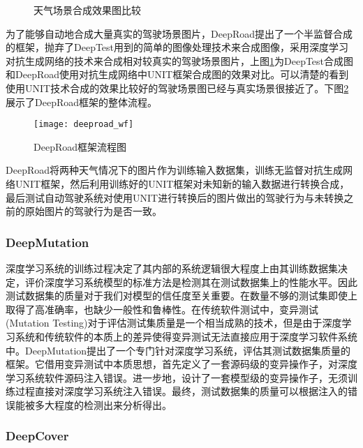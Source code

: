\begin{figure}[h]
    \centering
    \label{deeptest_effect}
    \caption{天气场景合成效果图比较}
\end{figure}

为了能够自动地合成大量真实的驾驶场景图片，DeepRoad提出了一个半监督合成的框架，抛弃了DeepTest用到的简单的图像处理技术来合成图像，采用深度学习对抗生成网络的技术来合成相对较真实的驾驶场景图片，上图\ref{deeptest_effect}为DeepTest合成图和DeepRoad使用对抗生成网络中UNIT\cite{UNIT}框架合成图的效果对比。可以清楚的看到使用UNIT技术合成的效果比较好的驾驶场景图已经与真实场景很接近了。下图\ref{deeproad_wf}展示了DeepRoad框架的整体流程。 

\begin{figure}[h]
    \centering
    \texttt{[image: deeproad\_wf]}
    \caption{DeepRoad框架流程图\cite{DeepRoad}}
    \label{deeproad_wf}
\end{figure}

DeepRoad将两种天气情况下的图片作为训练输入数据集，训练无监督对抗生成网络UNIT\cite{UNIT}框架，然后利用训练好的UNIT框架对未知新的输入数据进行转换合成，最后测试自动驾驶系统对使用UNIT进行转换后的图片做出的驾驶行为与未转换之前的原始图片的驾驶行为是否一致。

\subsubsection{DeepMutation}

深度学习系统的训练过程决定了其内部的系统逻辑很大程度上由其训练数据集决定，评价深度学习系统模型的标准方法是检测其在测试数据集上的性能水平。因此测试数据集的质量对于我们对模型的信任度至关重要。在数量不够的测试集即使上取得了高准确率，也缺少一般性和鲁棒性。在传统软件测试中，变异测试(Mutation Testing)对于评估测试集质量是一个相当成熟的技术，但是由于深度学习系统和传统软件的本质上的差异使得变异测试无法直接应用于深度学习软件系统中。DeepMutation提出了一个专门针对深度学习系统，评估其测试数据集质量的框架。它借用变异测试中本质思想，首先定义了一套源码级的变异操作子，对深度学习系统软件源码注入错误。进一步地，设计了一套模型级的变异操作子，无须训练过程直接对深度学习系统注入错误。最终，测试数据集的质量可以根据注入的错误能被多大程度的检测出来分析得出。

\subsubsection{DeepCover}

